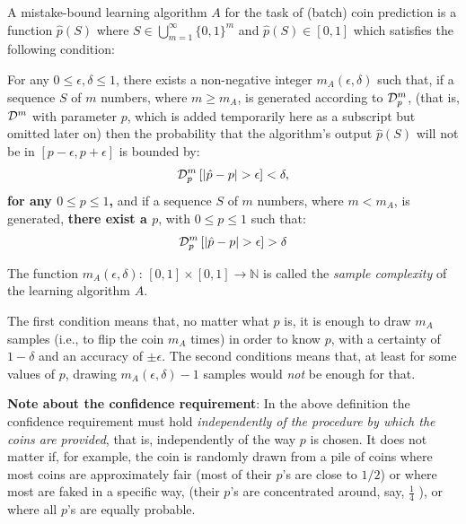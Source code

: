 \begin{definition}  \label{def:sampleCoin}
A mistake-bound learning algorithm $A$ for the task of (batch) coin prediction is a function $\hat{p}(S)$
where $S\in \bigcup_{m=1} ^\infty \{0,1\}^m$ and $\hat{p}(S)\in [0,1]$ which satisfies the following condition:
 
For any $0\le \epsilon,\delta\le 1$, there exists a non-negative integer $m_A(\epsilon,\delta)$ such that, 
 if a sequence $S$ of $m$ numbers, where $m\ge m_A$, is generated according to $\mathcal{D}^m_p$, (that is, $\mathcal{D}^m$ with parameter $p$, which is added temporarily here as a subscript but omitted later on) then the probability that the algorithm's output $\hat{p}(S)$ will not be in $[p-\epsilon,p+\epsilon]$ is bounded by:
$$ \mathcal{D}^{m}_p \left[ |\hat{p}-p| > \epsilon\right] <  \delta,$$
\textbf{for any $0\le p\le 1$,} and if a sequence $S$ of $m$ numbers, where $m < m_A$, is generated, \textbf{there exist a $p$}, with $0\le p\le 1$ such that:
$$ \mathcal{D}^{m}_p \left[ |\hat{p}-p| >  \epsilon \right] > \delta$$

The function $m_A(\epsilon,\delta)$: $\left[0,1\right]\times \left[0,1\right]\rightarrow \mathbb{N}$ is called the \emph{sample complexity} of the learning algorithm $A$.

\end{definition}

The first condition means that, no matter what $p$ is, it is enough to draw $m_A$ samples (i.e., to flip the coin $m_A$ times) in order to know $p$, with a certainty of $1-\delta$ and an accuracy of $\pm \epsilon$. The second conditions means that, at least for some values of $p$, drawing $m_A(\epsilon,\delta)-1$ samples would \textit{not} be enough for that.

\textbf{Note about the confidence requirement}: In the above definition the confidence requirement must hold \emph{independently of the procedure by which the coins are provided}, that is, independently of the way $p$ is chosen. It does not matter if, for example, the coin is randomly drawn from a pile of coins where most coins are approximately fair (most of their $p$'s are close to $1/2$) or where most are faked in a specific way, (their $p$'s are concentrated around, say, $\frac{1}{4}$ ),  or where all $p$'s are equally probable. 

